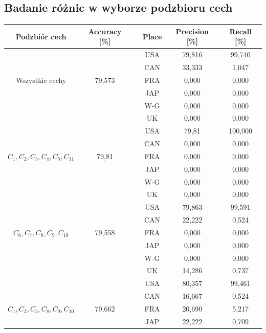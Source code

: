 \documentclass{classrep}
\begin{document}
\newpage
\subsection{Badanie różnic w wyborze podzbioru cech}
\begin{table}[h!]
	\centering
	\begin{tabular} {c c c c c c}
		\hline
		\textbf{Podzbiór cech} & \textbf{Accuracy [\%]} & \vline & \textbf{Place} & \textbf{Precision [\%]} & \textbf{Recall [\%]}\\ [0.5ex] 
		\hline
		\hline 
		&   							&\vline& USA & 79,816 & 99,740 \\
		&								&\vline& CAN & 33,333 & 1,047 \\
		Wszystkie cechy & 79,573        &\vline& FRA & 0,000 & 0,000 \\
		&								&\vline& JAP & 0,000 & 0,000 \\
		&								&\vline& W-G & 0,000 & 0,000 \\
		&		 						&\vline& UK  & 0,000 & 0,000 \\
		\hline 
		&   										 	&\vline& USA & 79,81 & 100,000 \\
		&												&\vline& CAN & 0,000 & 0,000 \\
		$C_1, C_2, C_3, C_4, C_5, C_{11}$ & 79,81       &\vline& FRA & 0,000 & 0,000 \\
		&												&\vline& JAP & 0,000 & 0,000 \\
		&												&\vline& W-G & 0,000 & 0,000 \\
		&		 										&\vline& UK  & 0,000 & 0,000 \\
		\hline 
		&   											&\vline& USA & 79,863 & 99,591 \\
		&												&\vline& CAN & 22,222 & 0,524 \\
		$C_6, C_7, C_8, C_9, C_{10}$ & 79,558        	&\vline& FRA & 0,000 & 0,000 \\
		&												&\vline& JAP & 0,000 & 0,000 \\
		&												&\vline& W-G & 0,000 & 0,000 \\
		&		 										&\vline& UK  & 14,286 & 0,737 \\
		\hline 
		&   											&\vline& USA & 80,357 & 99,461 \\
		&												&\vline& CAN & 16,667 & 0,524 \\
		$C_1, C_2, C_3, C_8, C_9, C_{10}$ & 79,662      &\vline& FRA & 20,690 & 5,217 \\
		&												&\vline& JAP & 22,222 & 0,709 \\

\end{tabular}
\end{table}
\end{document}
